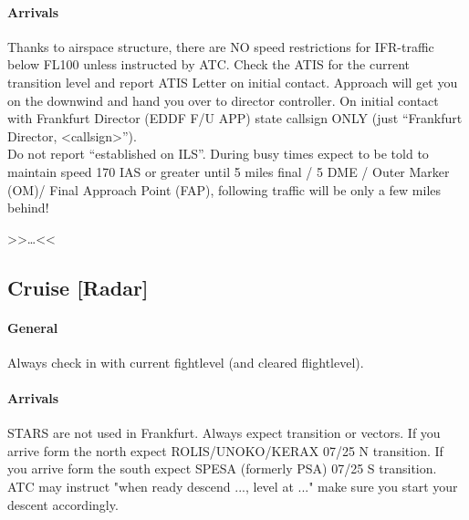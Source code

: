 \paragraph{Arrivals}
Thanks to airspace structure, there are NO speed restrictions for IFR-traffic below FL100 unless
instructed by ATC.
Check the ATIS for the current transition level and report ATIS Letter on initial contact.
Approach will get you on the downwind and hand you over to director controller.
On initial contact with Frankfurt Director (EDDF F/U APP) state callsign ONLY (just “Frankfurt Director, <callsign>”).\\
Do not report “established on ILS”. During busy times expect to be told to maintain speed 170 IAS or greater until 5 miles final / 5 DME / Outer Marker (OM)/ Final Approach Point (FAP), following traffic will be only a few miles behind! 

>>\dots<<

\subsection[CTR]{Cruise [Radar]}
\paragraph{General}
Always check in with current fightlevel (and cleared flightlevel).

\paragraph{Arrivals}
STARS are not used in Frankfurt. Always expect transition or vectors.
If you arrive form the north expect ROLIS/UNOKO/KERAX 07/25 N transition.
If you arrive form the south expect SPESA (formerly PSA) 07/25 S transition.
ATC may instruct "when ready descend ..., level at ..." make sure you start your descent accordingly.
